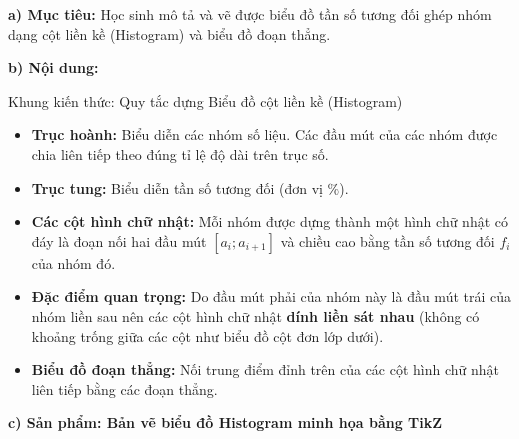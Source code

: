 \documentclass[12pt, a4paper]{article}
\begin{document}
\noindent \textbf{a) Mục tiêu:}
Học sinh mô tả và vẽ được biểu đồ tần số tương đối ghép nhóm dạng cột liền kề (Histogram) và biểu đồ đoạn thẳng.

\noindent \textbf{b) Nội dung:}
\begin{pedabox}{Khung kiến thức: Quy tắc dựng Biểu đồ cột liền kề (Histogram)}
\begin{itemize}[leftmargin=0.6cm]
    \item \textbf{Trục hoành:} Biểu diễn các nhóm số liệu. Các đầu mút của các nhóm được chia liên tiếp theo đúng tỉ lệ độ dài trên trục số.
    \item \textbf{Trục tung:} Biểu diễn tần số tương đối (đơn vị $\%$).
    \item \textbf{Các cột hình chữ nhật:} Mỗi nhóm được dựng thành một hình chữ nhật có đáy là đoạn nối hai đầu mút $[a_i; a_{i+1}]$ và chiều cao bằng tần số tương đối $f_i$ của nhóm đó.
    \item \textbf{Đặc điểm quan trọng:} Do đầu mút phải của nhóm này là đầu mút trái của nhóm liền sau nên các cột hình chữ nhật \textbf{dính liền sát nhau} (không có khoảng trống giữa các cột như biểu đồ cột đơn lớp dưới).
    \item \textbf{Biểu đồ đoạn thẳng:} Nối trung điểm đỉnh trên của các cột hình chữ nhật liên tiếp bằng các đoạn thẳng.
\end{itemize}
\end{pedabox}

\noindent \textbf{c) Sản phẩm: Bản vẽ biểu đồ Histogram minh họa bằng TikZ}
\begin{center}
\end{center}
\end{document}

